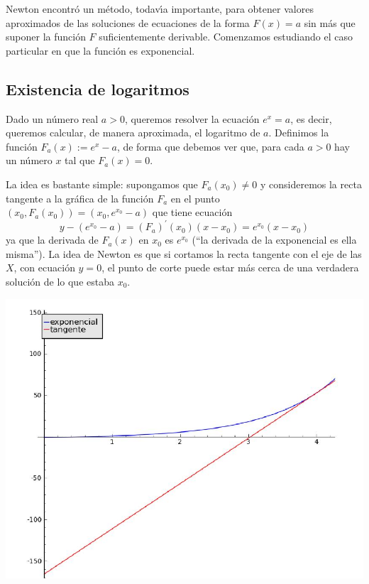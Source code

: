 Newton encontr\'o un m\'etodo, todav\'{\i}a importante,  para obtener valores
aproximados de las soluciones de ecuaciones de la forma $F(x)=a$ sin m\'as que
suponer la funci\'on $F$ suficientemente derivable. Comenzamos estudiando el
caso particular en que la funci\'on es exponencial.

\subsection{Existencia de logaritmos}

Dado un n\'umero real $a>0$, queremos  resolver la ecuaci\'on $e^x=a$, es decir,
queremos calcular, de manera aproximada,  el logaritmo de $a$. Definimos la
funci\'on
$F_a(x):=e^x-a$, de forma que debemos ver que, para cada $a>0$ hay un n\'umero
$x$ tal que $F_a(x)=0$.

La idea es bastante simple: supongamos que $F_a(x_0)\ne 0$ y consideremos la
recta tangente a la gr\'afica de la funci\'on $F_a$ en el punto
$(x_0,F_a(x_0))=(x_0,e^{x_0}-a)$ que tiene ecuaci\'on 
\[y-(e^{x_0}-a)=(F_a)^{\prime}(x_0)(x-x_0)=e^{x_0}(x-x_0)\]
\noindent ya que la derivada de $F_a(x)$ en $x_0$ es $e^{x_0}$ (``la derivada de
la exponencial es ella misma''). La idea de Newton es que si cortamos la recta
tangente con el eje de las $X$, con ecuaci\'on $y=0$, el punto de corte puede
estar m\'as cerca de una verdadera soluci\'on de lo que estaba $x_0$. 

\begin{center}
 \includegraphics[scale=0.3]{imagenes/graf_exp2}
\end{center}

